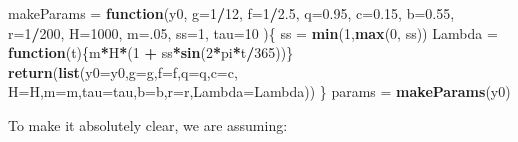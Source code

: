 \documentclass[
]{book}
\newenvironment{Shaded}{\begin{snugshade}}{\end{snugshade}}
\newcommand{\AttributeTok}[1]{\textcolor[rgb]{0.13,0.29,0.53}{#1}}
\newcommand{\ControlFlowTok}[1]{\textcolor[rgb]{0.13,0.29,0.53}{\textbf{#1}}}
\newcommand{\DecValTok}[1]{\textcolor[rgb]{0.00,0.00,0.81}{#1}}
\newcommand{\FloatTok}[1]{\textcolor[rgb]{0.00,0.00,0.81}{#1}}
\newcommand{\FunctionTok}[1]{\textcolor[rgb]{0.13,0.29,0.53}{\textbf{#1}}}
\newcommand{\NormalTok}[1]{#1}
\newcommand{\OtherTok}[1]{\textcolor[rgb]{0.56,0.35,0.01}{#1}}
\newcommand{\SpecialCharTok}[1]{\textcolor[rgb]{0.81,0.36,0.00}{\textbf{#1}}}
\begin{document}
\begin{Shaded}
\begin{Highlighting}[]
\NormalTok{makeParams }\OtherTok{=} \ControlFlowTok{function}\NormalTok{(y0, }
                      \AttributeTok{g=}\DecValTok{1}\SpecialCharTok{/}\DecValTok{12}\NormalTok{, }\AttributeTok{f=}\DecValTok{1}\SpecialCharTok{/}\FloatTok{2.5}\NormalTok{, }\AttributeTok{q=}\FloatTok{0.95}\NormalTok{,  }
                      \AttributeTok{c=}\FloatTok{0.15}\NormalTok{,}
                      \AttributeTok{b=}\FloatTok{0.55}\NormalTok{, }\AttributeTok{r=}\DecValTok{1}\SpecialCharTok{/}\DecValTok{200}\NormalTok{, }\AttributeTok{H=}\DecValTok{1000}\NormalTok{,  }
                      \AttributeTok{m=}\NormalTok{.}\DecValTok{05}\NormalTok{, }\AttributeTok{ss=}\DecValTok{1}\NormalTok{,  }
                      \AttributeTok{tau=}\DecValTok{10}  
\NormalTok{                      )\{}
\NormalTok{  ss }\OtherTok{=} \FunctionTok{min}\NormalTok{(}\DecValTok{1}\NormalTok{,}\FunctionTok{max}\NormalTok{(}\DecValTok{0}\NormalTok{, ss))}
\NormalTok{  Lambda }\OtherTok{=} \ControlFlowTok{function}\NormalTok{(t)\{m}\SpecialCharTok{*}\NormalTok{H}\SpecialCharTok{*}\NormalTok{(}\DecValTok{1} \SpecialCharTok{+}\NormalTok{ ss}\SpecialCharTok{*}\FunctionTok{sin}\NormalTok{(}\DecValTok{2}\SpecialCharTok{*}\NormalTok{pi}\SpecialCharTok{*}\NormalTok{t}\SpecialCharTok{/}\DecValTok{365}\NormalTok{))\}}
  \FunctionTok{return}\NormalTok{(}\FunctionTok{list}\NormalTok{(}\AttributeTok{y0=}\NormalTok{y0,}\AttributeTok{g=}\NormalTok{g,}\AttributeTok{f=}\NormalTok{f,}\AttributeTok{q=}\NormalTok{q,}\AttributeTok{c=}\NormalTok{c,}
              \AttributeTok{H=}\NormalTok{H,}\AttributeTok{m=}\NormalTok{m,}\AttributeTok{tau=}\NormalTok{tau,}\AttributeTok{b=}\NormalTok{b,}\AttributeTok{r=}\NormalTok{r,}\AttributeTok{Lambda=}\NormalTok{Lambda))}
\NormalTok{\} }
\NormalTok{params }\OtherTok{=} \FunctionTok{makeParams}\NormalTok{(y0)}
\end{Highlighting}
\end{Shaded}

To make it absolutely clear, we are assuming:
\end{document}
